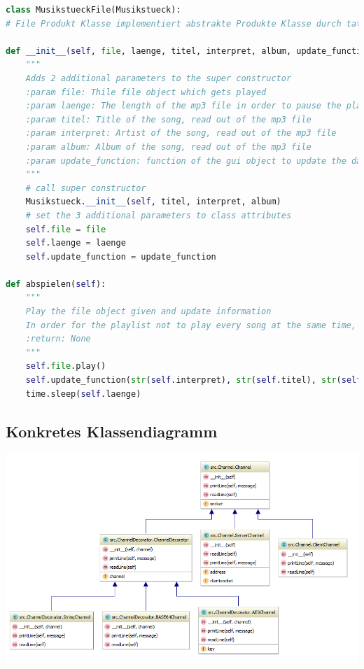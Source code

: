 \begin{lstlisting}[language=python]
class MusikstueckFile(Musikstueck):
# File Produkt Klasse implementiert abstrakte Produkte Klasse durch tatsaechliche Ausgabe via pyglet

def __init__(self, file, laenge, titel, interpret, album, update_function):
	"""
	Adds 2 additional parameters to the super constructor
	:param file: Thile file object which gets played
	:param laenge: The length of the mp3 file in order to pause the playlist for this amount
	:param titel: Title of the song, read out of the mp3 file
	:param interpret: Artist of the song, read out of the mp3 file
	:param album: Album of the song, read out of the mp3 file
	:param update_function: function of the gui object to update the data
	"""
	# call super constructor
	Musikstueck.__init__(self, titel, interpret, album)
	# set the 3 additional parameters to class attributes
	self.file = file
	self.laenge = laenge
	self.update_function = update_function

def abspielen(self):
	"""
	Play the file object given and update information
	In order for the playlist not to play every song at the same time, everytime a song is played, time.sleep for the length of the song
	:return: None
	"""
	self.file.play()
	self.update_function(str(self.interpret), str(self.titel), str(self.album))
	time.sleep(self.laenge)
\end{lstlisting}

\subsection{Konkretes Klassendiagramm}
\begin{minipage}{\linewidth}
	\centering
	\includegraphics[width=1\linewidth]{images/uml_specific}
\end{minipage}


